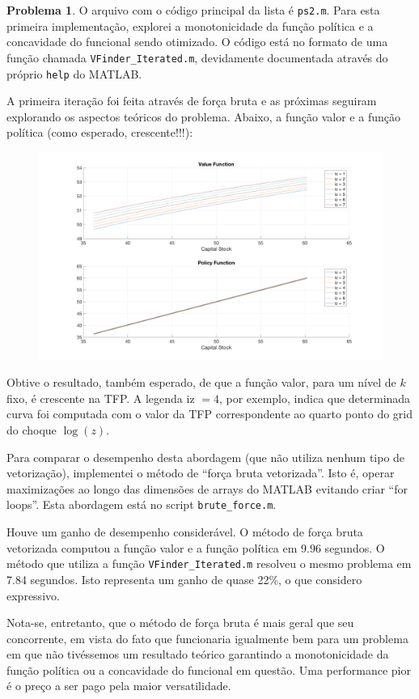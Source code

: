 \documentclass[11pt]{article}
\theoremstyle{definition}
\theoremstyle{definition}
\newtheorem{problema}{Problema}
\theoremstyle{solution}
\begin{document}
\begin{problema}
	O arquivo com o código principal da lista é \texttt{ps2.m}. Para esta primeira implementação, explorei a monotonicidade da função política e a concavidade do funcional sendo otimizado. O código está no formato de uma função chamada \texttt{VFinder\_Iterated.m}, devidamente documentada através do próprio \texttt{help} do MATLAB.
	
	A primeira iteração foi feita através de força bruta e as próximas seguiram explorando os aspectos teóricos do problema. Abaixo, a função valor e a função política (como esperado, crescente!!!):
	\begin{figure}[htb!]
		\centering
		\includegraphics[scale = 0.22]{problem3_V_vs_G}
	\end{figure}
	
	Obtive o resultado, também esperado, de que a função valor, para um nível de $k$ fixo, é crescente na TFP. A legenda iz $= 4$, por exemplo, indica que determinada curva foi computada com o valor da TFP correspondente ao quarto ponto do grid do choque $\log (z)$.
	
	Para comparar o desempenho desta abordagem (que não utiliza nenhum tipo de vetorização), implementei o método de ``força bruta vetorizada''. Isto é, operar maximizações ao longo das dimensões de arrays do MATLAB evitando criar ``for loops''. Esta abordagem está no script \texttt{brute\_force.m}.
	
	Houve um ganho de desempenho considerável. O método de força bruta vetorizada computou a função valor e a função política em 9.96 segundos. O método que utiliza a função \texttt{VFinder\_Iterated.m} resolveu o mesmo problema em 7.84 segundos. Isto representa um ganho de quase 22\%, o que considero expressivo. 
	
	Nota-se, entretanto, que o método de força bruta é mais geral que seu concorrente, em vista do fato que funcionaria igualmente bem para um problema em que não tivéssemos um resultado teórico garantindo a monotonicidade da função política ou a concavidade do funcional em questão. Uma performance pior é o preço a ser pago pela maior versatilidade.
	\end{problema}
	
\end{document}
